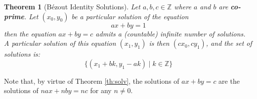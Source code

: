 \documentclass{article}
\newtheorem{theorem}{Theorem}
\begin{document}
\begin{theorem}[Bézout Identity Solutions]
Let $a,b,c \in \mathbb{Z}$ where $a$ and $b$ are \textbf{co-prime}. Let $(x_0,y_0)$ be a particular solution of the equation 
$$a x + b y = 1$$
\noindent then the equation $a x + b y = c$ admits a (countable) infinite number of solutions. A particular solution of this equation $(x_1,y_1)$ is then $(c x_0, c y_1)$, and the set of solutions is:
$$\{ (x_1 + b k, y_1 - a k) \mid k \in \mathbb{Z} \}$$
\end{theorem}

Note that, by virtue of Theorem \ref{th:solv}, the solutions of $a x + b y = c$ are the solutions of $n a x + n b y = n c$ for any $n \neq 0$.
\end{document}
